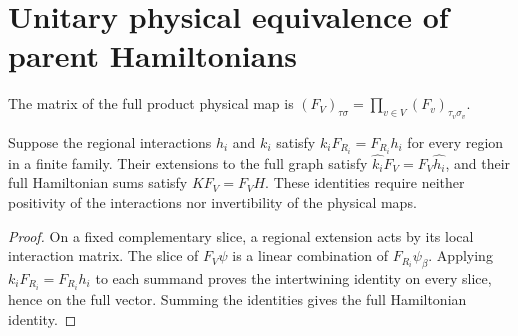 \section{Unitary physical equivalence of parent Hamiltonians}%
\label{sec:peps_region_physical_hamiltonian_transport}

\begin{definition}%
    \label{def:peps_global_physical_matrix}
    \leanok
    The matrix of the full product physical map is
    $(F_V)_{\tau\sigma}=\prod_{v\in V}(F_v)_{\tau_v\sigma_v}$.
\end{definition}

\begin{lemma}%
    \label{thm:peps_region_physical_intertwining}
    \leanok
    Suppose the regional interactions $h_i$ and $k_i$ satisfy
    $k_iF_{R_i}=F_{R_i}h_i$ for every region in a finite family.
    Their extensions to the full graph satisfy
    $\widehat{k_i}F_V=F_V\widehat{h_i}$, and their full Hamiltonian
    sums satisfy $KF_V=F_VH$.
    These identities require neither positivity of the interactions
    nor invertibility of the physical maps.
\end{lemma}

\begin{proof}\leanok
    On a fixed complementary slice, a regional extension acts by its
    local interaction matrix. The slice of $F_V\psi$ is a linear
    combination of $F_{R_i}\psi_\beta$.
    Applying $k_iF_{R_i}=F_{R_i}h_i$ to each summand proves the
    intertwining identity on every slice, hence on the full vector.
    Summing the identities gives the full Hamiltonian identity.
\end{proof}

